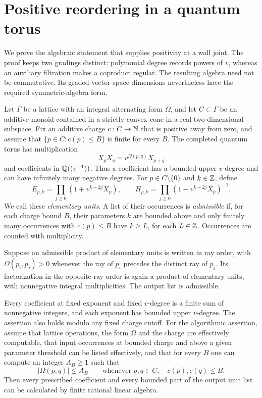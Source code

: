 \section{Positive reordering in a quantum torus}
\label{alg:section}

We prove the algebraic statement that supplies positivity at a wall joint.
The proof keeps two gradings distinct: polynomial degree records powers of
$v$, whereas an auxiliary filtration makes a coproduct regular.  The
resulting algebra need not be commutative.  Its graded vector-space
dimensions nevertheless have the required symmetric-algebra form.

Let $\Gamma$ be a lattice with an integral alternating form $\Omega$, and
let $C\subset\Gamma$ be an additive monoid contained in a strictly convex
cone in a real two-dimensional subspace.  Fix an additive charge
$c:C\to\mathbb N$ that is positive away from zero, and assume that
$\{p\in C:c(p)\le B\}$ is finite for every $B$.  The completed quantum
torus has multiplication
\begin{equation}\label{alg:torus}
 X_pX_q=v^{\Omega(p,q)}X_{p+q}
\end{equation}
and coefficients in $\mathbb Q((v^{-1}))$.  Thus a coefficient has a bounded
upper $v$-degree and can have infinitely many negative degrees.
For $p\in C\setminus\{0\}$ and $k\in\mathbb Z$, define
\begin{equation}\label{alg:units}
 E_{p,k}=\prod_{j\ge0}(1+v^{k-2j}X_p),\qquad
 H_{p,k}=\prod_{j\ge0}(1-v^{k-2j}X_p)^{-1}.
\end{equation}
We call these \emph{elementary units}.  A list of their occurrences is
\emph{admissible} if, for each charge bound $B$, their parameters $k$ are
bounded above and only finitely many occurrences with $c(p)\le B$ have
$k\ge L$, for each $L\in\mathbb Z$.  Occurrences are counted with multiplicity.

\begin{theorem}\label{alg:reordering}
Suppose an admissible product of elementary units is written in ray
order, with $\Omega(p_i,p_j)>0$ whenever the ray of $p_i$ precedes the
distinct ray of $p_j$.  Its factorization in the opposite ray order is
again a product of elementary units, with nonnegative integral
multiplicities.  The output list is admissible.

Every coefficient at fixed exponent and fixed $v$-degree is a finite
sum of nonnegative integers, and each exponent has bounded upper
$v$-degree.  The assertion also holds modulo any fixed charge cutoff.
For the algorithmic assertion, assume that lattice operations, the form
$\Omega$ and the charge are effectively computable, that input occurrences
at bounded charge and above a given parameter threshold can be listed
effectively, and that for every $B$ one can compute an integer $A_B\ge1$
such that
\[
 |\Omega(p,q)|\le A_B
 \qquad\text{whenever }p,q\in C,\quad c(p),c(q)\le B.
\]
Then every prescribed coefficient and every bounded part of the output
unit list can be calculated by finite rational linear algebra.
\end{theorem}


